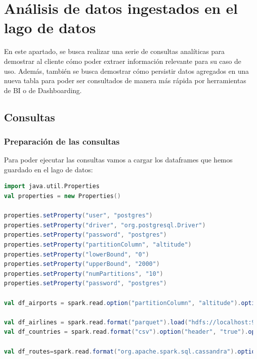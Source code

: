 \chapter{Análisis de datos ingestados en el lago de datos}

En este apartado, se busca realizar una serie de consultas analíticas para demostrar al cliente cómo poder extraer información relevante para su caso de uso. Además, también se busca demostrar cómo persistir datos agregados en una nueva tabla para poder ser consultados de manera más rápida por herramientas de BI o de Dashboarding.

\section{Consultas}

\subsection{Preparación de las consultas}

Para poder ejecutar las consultas vamos a cargar los dataframes que hemos guardado en el lago de datos:

\begin{lstlisting}[language=scala]
import java.util.Properties
val properties = new Properties()

properties.setProperty("user", "postgres")
properties.setProperty("driver", "org.postgresql.Driver")
properties.setProperty("password", "postgres")
properties.setProperty("partitionColumn", "altitude")
properties.setProperty("lowerBound", "0")
properties.setProperty("upperBound", "2000")
properties.setProperty("numPartitions", "10")
properties.setProperty("password", "postgres")

val df_airports = spark.read.option("partitionColumn", "altitude").option("lowerBound", 0).option("upperBound", 2000).option("numPartitions", 10).jdbc("jdbc:postgresql://localhost:5432/postgres", "airports", properties)

val df_airlines = spark.read.format("parquet").load("hdfs://localhost:9000/practica/airlines/")
val df_countries = spark.read.format("csv").option("header", "true").option("inferSchema", "true").load("hdfs://localhost:9000/practica/countries/")

val df_routes=spark.read.format("org.apache.spark.sql.cassandra").option("spark.cassandra.connection.host","127.0.0.1").option("spark.cassandra.connection.port","9042").option("keyspace", "practica").option("table", "routes").load()
\end{lstlisting}

